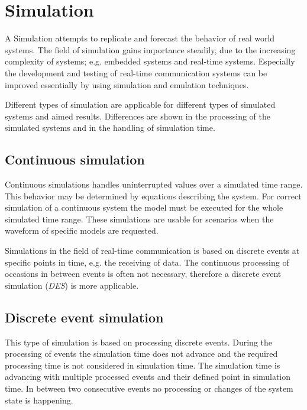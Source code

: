 \chapter{Simulation}
\label{cha:simulation}

A Simulation attempts to replicate and forecast the behavior of real world systems.
The field of simulation gains importance steadily, due to the increasing complexity of systems; e.g. embedded systems and real-time systems.
Especially the development and testing of real-time communication systems can be improved essentially by using simulation and emulation techniques.

Different types of simulation are applicable for different types of simulated systems and aimed results.
Differences are shown in the processing of the simulated systems and in the handling of simulation time.
\cite[section 1.2]{mchaney2009understanding}

\section{Continuous simulation}
\label{sec:simulation_cont}
Continuous simulations handles uninterrupted values over a simulated time range.
This behavior may be determined by equations describing the system.
For correct simulation of a continuous system the model must be executed for the whole simulated time range.
These simulations are usable for scenarios when the waveform of specific models are requested. \cite[section 1.2.1]{mchaney2009understanding}

Simulations in the field of real-time communication is based on discrete events at specific points in time, e.g. the receiving of data.
The continuous processing of occasions in between events is often not necessary, therefore a discrete event simulation (\emph{DES}) is more applicable.

\section{Discrete event simulation}
\label{sec:simulation_event}
This type of simulation is based on processing discrete events.
During the processing of events the simulation time does not advance and the required processing time is not considered in simulation time.
The simulation time is advancing with multiple processed events and their defined point in simulation time.
In between two consecutive events no processing or changes of the system state is happening. \cite[chapter 1]{matloff_introduction_2008}

